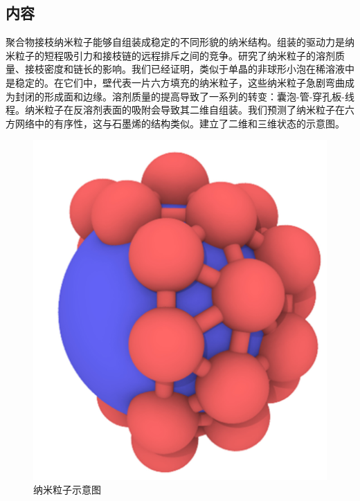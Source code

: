 \documentclass[12pt,a4paper]{article}
\numberwithin{equation}{section}
\begin{document}
\subsection{内容}
聚合物接枝纳米粒子能够自组装成稳定的不同形貌的纳米结构。组装的驱动力是纳米粒子的短程吸引力和接枝链的远程排斥之间的竞争。研究了纳米粒子的溶剂质量、接枝密度和链长的影响。我们已经证明，类似于单晶的非球形小泡在稀溶液中是稳定的。在它们中，壁代表一片六方填充的纳米粒子，这些纳米粒子急剧弯曲成为封闭的形成面和边缘。溶剂质量的提高导致了一系列的转变：囊泡-管-穿孔板-线程。纳米粒子在反溶剂表面的吸附会导致其二维自组装。我们预测了纳米粒子在六方网络中的有序性，这与石墨烯的结构类似。建立了二维和三维状态的示意图。\\
\begin{figure}[H]
\centering
\includegraphics[scale=0.4]{./figures/23.png}
\caption{纳米粒子示意图}
\end{figure}
\end{document}
